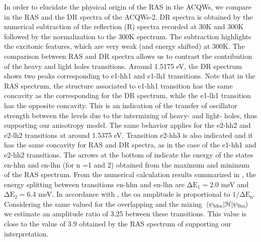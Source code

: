 In order to elucidate the physical origin of the RAS in the \gls{ACQWs}, we compare in  the RAS and the DR spectra of the \gls{ACQWs}-2. DR spectra is obtained by the numerical subtraction of the reflection (R) spectra recorded at 30K and 300K followed by the normalization to the 300K spectrum. The subtraction highlights the excitonic features, which are very weak (and energy shifted) at 300K. The comparison between RAS and DR spectra allows us to contrast the contribution of the heavy and light holes transitions. Around 1.5175 eV, the DR spectrum shows two peaks corresponding to e1-hh1 and e1-lh1 transitions. Note that in the RAS spectrum, the structure associated to e1-hh1 transition has the same concavity as the corresponding for the DR spectrum, while the e1-lh1 transition has the opposite concavity. This  is an indication of the transfer of oscillator strength between the levels due to the intermixing of heavy- and light- holes, thus supporting our anisotropy model. The same behavior applies for the e2-hh2 and e2-lh2 transitions at around 1.5375 eV. Transition e2-hh3 is also indicated and it has the same concavity for RAS and DR spectra, as in the case of the e1-hh1 and e2-hh2 transitions.
The arrows at the bottom of  indicate the energy of the states en-hhn and en-lhn (for n =1 and 2) obtained from the  maximum and minimum of the RAS spectrum. 
From the numerical calculation results summarized in  , the energy splitting between transitions  en-hhn and  en-lhn  are $\mathrm{\Delta E_1}=2.0$ meV and $\mathrm{\Delta E_2}=6.4$ meV. In accordance with , the \gls{oa} amplitude is proportional to $1/\mathrm{\Delta E_n}$. Considering the same valued for the overlapping and the mixing $\mel{\psi_{\mathrm{hhn}}}{\cal{H}}{\psi_{\mathrm{lhn}}}$ we estimate an amplitude ratio of 3.25 between these transitions. This value is close to the value of 3.9 obtained by the RAS spectrum of  supporting our interpretation.

